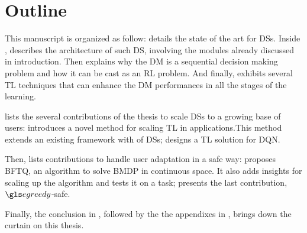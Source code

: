 \printbibliography[keyword={me},heading=none]

\section{Outline}


This manuscript is organized as follow:  details the state of the art for  \glspl{DS}. Inside ,  describes the architecture of such \gls{DS}, involving the modules already discussed in introduction. Then  explains why the \gls{DM} is a sequential decision making problem and how it can be cast as an \gls{RL} problem. And finally,  exhibits several \gls{TL} techniques that can enhance the \gls{DM} performances in all the stages of the learning.

 lists the several contributions of the thesis to scale \glspl{DS} to a growing base of users:  introduces a novel method for scaling \gls{TL} in  applications.This method extends an existing framework with  of \glspl{DS};  designs a \gls{TL} solution for \gls{DQN}.

Then,  lists contributions to handle user adaptation in a safe way:   proposes \gls{BFTQ}, an algorithm to solve \gls{BMDP} in continuous space. It also adds insights for scaling up the algorithm and tests it on a  task;  presents the last contribution, $\egreedy$-safe.

Finally, the conclusion in , followed by the the appendixes in , brings down the curtain on this thesis.